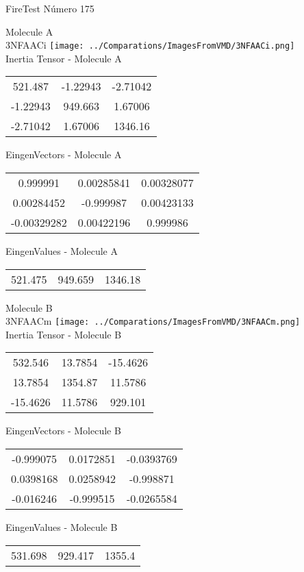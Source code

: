 \vtab[-2cm]
\begin{center}
{\large FireTest \tab Número 175}
\end{center}
\begin{multicols}{2}
\begin{center}

Molecule A \\ 
3NFAACi
\texttt{[image: ../Comparations/ImagesFromVMD/3NFAACi.png]}
\\
Inertia Tensor - Molecule A \\
\vtab

\begin{tabular}{|c c c|}
521.487	 & 	-1.22943	 & 	-2.71042	 \\
-1.22943	 & 	949.663	 & 	1.67006	 \\
-2.71042	 & 	1.67006	 & 	1346.16
\end{tabular}

\vtab
 EingenVectors - Molecule A     \\
\vtab
\begin{tabular}{|c c c|}
0.999991	 & 	0.00285841	 & 	0.00328077	 \\
0.00284452	 & 	-0.999987	 & 	0.00423133	 \\
-0.00329282	 & 	0.00422196	 & 	0.999986
\end{tabular}

\vtab
 EingenValues - Molecule A     \\
\vtab
\begin{tabular}{|c c c|}
521.475	 & 	949.659	 & 	1346.18	 \\
\end{tabular}
\columnbreak

Molecule B \\ 
3NFAACm
\texttt{[image: ../Comparations/ImagesFromVMD/3NFAACm.png]}
\\
Inertia Tensor - Molecule B \\
\vtab

\begin{tabular}{|c c c|}
532.546	 & 	13.7854	 & 	-15.4626	 \\
13.7854	 & 	1354.87	 & 	11.5786	 \\
-15.4626	 & 	11.5786	 & 	929.101
\end{tabular}

\vtab
 EingenVectors - Molecule B     \\
\vtab
\begin{tabular}{|c c c|}
-0.999075	 & 	0.0172851	 & 	-0.0393769	 \\
0.0398168	 & 	0.0258942	 & 	-0.998871	 \\
-0.016246	 & 	-0.999515	 & 	-0.0265584
\end{tabular}

\vtab
 EingenValues - Molecule B     \\
\vtab
\begin{tabular}{|c c c|}
531.698	 & 	929.417	 & 	1355.4	 \\
\end{tabular}

\end{center}
\end{multicols}
